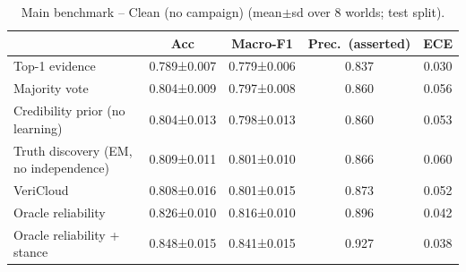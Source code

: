 \begin{table}[t]
\centering
\caption{Main benchmark -- Clean (no campaign) (mean$\pm$sd over 8 worlds; test split).}
\label{tab:main_clean}
\small
\begin{tabular}{lcccc}
\toprule
 & Acc & Macro-F1 & Prec.\ (asserted) & ECE \\
\midrule
Top-1 evidence & 0.789±0.007 & 0.779±0.006 & 0.837 & 0.030 \\
Majority vote & 0.804±0.009 & 0.797±0.008 & 0.860 & 0.056 \\
Credibility prior (no learning) & 0.804±0.013 & 0.798±0.013 & 0.860 & 0.053 \\
Truth discovery (EM, no independence) & 0.809±0.011 & 0.801±0.010 & 0.866 & 0.060 \\
VeriCloud & 0.808±0.016 & 0.801±0.015 & 0.873 & 0.052 \\
Oracle reliability & 0.826±0.010 & 0.816±0.010 & 0.896 & 0.042 \\
Oracle reliability + stance & 0.848±0.015 & 0.841±0.015 & 0.927 & 0.038 \\
\bottomrule
\end{tabular}
\end{table}

